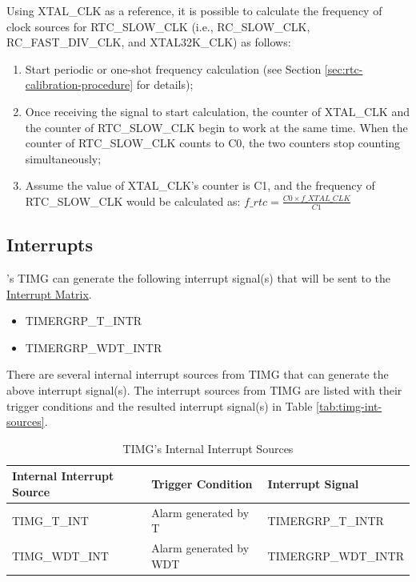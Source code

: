 \documentclass[main\_\_EN.tex]{subfiles}
\begin{document}
Using XTAL\_CLK as a reference, it is possible to calculate the frequency of clock sources for RTC\_SLOW\_CLK (i.e., RC\_SLOW\_CLK, RC\_FAST\_DIV\_CLK, and XTAL32K\_CLK) as follows:

\begin{enumerate}
    \item Start periodic or one-shot frequency calculation (see Section \ref{sec:rtc-calibration-procedure} for details);
    \item Once receiving the signal to start calculation, the counter of XTAL\_CLK and the counter of RTC\_SLOW\_CLK begin to work at the same time. When the counter of RTC\_SLOW\_CLK counts to C0, the two counters stop counting simultaneously;
    \item Assume the value of XTAL\_CLK's counter is C1, and the frequency of RTC\_SLOW\_CLK would be calculated as:
    $f\_rtc = \frac{C0 \times f\_XTAL\_CLK}{C1}$
\end{enumerate}

\subsection{Interrupts}\label{sec:timg-interrupt}

\chipname{}'s TIMG can generate the following interrupt signal(s) that will be sent to the \hyperref[mod:intmtrx]{Interrupt Matrix}.

    \begin{itemize}
        \item TIMERGRP\_T\_INTR
        \item TIMERGRP\_WDT\_INTR
    \end{itemize}

There are several internal interrupt sources from TIMG that can generate the above interrupt signal(s). The interrupt sources from TIMG are listed with their trigger conditions and the resulted interrupt signal(s) in Table \ref{tab:timg-int-sources}.

\begin{longtable}{ | L{5cm} | L{6.5cm} | L{4cm} | }
\caption{TIMG's Internal Interrupt Sources} \label{tab:timg-int-sources}
\\ \hline
{}
\textbf{Internal Interrupt Source} & \textbf{Trigger Condition}  &  \textbf{Interrupt Signal}\\ \hline
\label{int:TIMGTxINT}TIMG\_T\_INT  &  Alarm generated by T &  TIMERGRP\_T\_INTR  \\ \hline
\label{int:TIMGWDTINT}TIMG\_WDT\_INT &  Alarm generated by WDT & TIMERGRP\_WDT\_INTR \\ \hline
\end{longtable}
\end{document}
